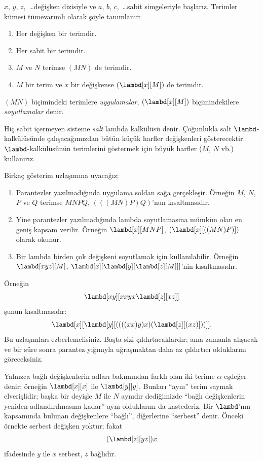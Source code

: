 \documentclass[../../../include/open-logic-section]{subfiles}
\begin{document}

$x$, $y$, $z$,~\dots değişken dizisiyle ve $a$, $b$, $c$,~\dots sabit
simgeleriyle başlarız. Terimler kümesi tümevarımlı olarak şöyle tanımlanır:
\begin{enumerate}
\item Her değişken bir terimdir.
\item Her sabit bir terimdir.
\item $M$ ve $N$ terimse $(MN)$ de terimdir.
\item $M$ bir terim ve $x$ bir değişkense $(\lambd[x][M])$ de terimdir.
\end{enumerate}
$(MN)$ biçimindeki terimlere \emph{uygulamalar}, $(\lambd[x][M])$
biçimindekilere \emph{soyutlamalar} denir.

Hiç sabit içermeyen sisteme \emph{salt} lambda kalkülüsü denir. Çoğunlukla
salt $\lambd$-kalkülüsünde çalışacağımızdan bütün küçük harfler değişkenleri
gösterecektir. $\lambd$-kalkülüsünün terimlerini göstermek için büyük harfler
($M$, $N$ vb.) kullanırız.

Birkaç gösterim uzlaşımına uyacağız:

\begin{conv}
\begin{enumerate}
\item Parantezler yazılmadığında uygulama soldan sağa gerçekleşir. Örneğin
  $M$, $N$, $P$ ve $Q$ terimse $MNPQ$, $(((MN)P)Q)$'nun kısaltmasıdır.
\item Yine parantezler yazılmadığında lambda soyutlamasına mümkün olan en
  geniş kapsam verilir. Örneğin $\lambd[x][MNP]$,
  $(\lambd[x][((MN)P)])$ olarak okunur.
\item Bir lambda birden çok değişkeni soyutlamak için kullanılabilir.
  Örneğin $\lambd[xyz][M]$,
  $\lambd[x][\lambd[y][\lambd[z][M]]]$'nin kısaltmasıdır.
\end{enumerate}
\end{conv}

Örneğin
\[
\lambd[xy][xxyx \lambd[z][xz]]
\]
şunun kısaltmasıdır:
\[
\lambd[x][\lambd[y][((((xx)y)x)(\lambd[z][(xz)]))]].
\]
Bu uzlaşımları ezberlemelisiniz. Başta sizi çıldırtacaklardır; ama zamanla
alışacak ve bir süre sonra parantez yığınıyla uğraşmaktan daha az
çıldırtıcı olduklarını göreceksiniz.

Yalnızca bağlı değişkenlerin adları bakımından farklı olan iki terime
$\alpha$-eşdeğer denir; örneğin $\lambd[x][x]$ ile $\lambd[y][y]$.
Bunları ``aynı'' terim saymak elverişlidir; başka bir deyişle $M$ ile $N$
aynıdır dediğimizde ``bağlı değişkenlerin yeniden adlandırılmasına kadar''
aynı olduklarını da kastederiz. Bir $\lambd$'nın kapsamında bulunan
değişkenlere ``bağlı'', diğerlerine ``serbest'' denir. Önceki örnekte serbest
değişken yoktur; fakat
\[
(\lambd[z][yz])x
\]
ifadesinde $y$ ile $x$ serbest, $z$ bağlıdır.
\end{document}
